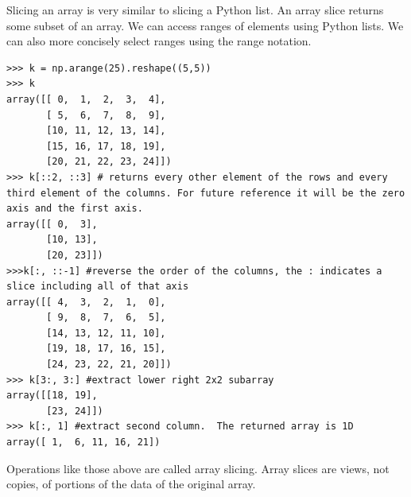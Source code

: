 Slicing an array is very similar to slicing a Python list. An array
slice returns some subset of an array. We can access ranges of elements
using Python lists. We can also more concisely select ranges using the
 range notation. 
\begin{lstlisting}
>>> k = np.arange(25).reshape((5,5)) 
>>> k
array([[ 0,  1,  2,  3,  4],
       [ 5,  6,  7,  8,  9],
       [10, 11, 12, 13, 14],
       [15, 16, 17, 18, 19],
       [20, 21, 22, 23, 24]])
>>> k[::2, ::3] # returns every other element of the rows and every third element of the columns. For future reference it will be the zero axis and the first axis.
array([[ 0,  3],
       [10, 13],
       [20, 23]])
>>>k[:, ::-1] #reverse the order of the columns, the : indicates a slice including all of that axis
array([[ 4,  3,  2,  1,  0],
       [ 9,  8,  7,  6,  5],
       [14, 13, 12, 11, 10],
       [19, 18, 17, 16, 15],
       [24, 23, 22, 21, 20]])
>>> k[3:, 3:] #extract lower right 2x2 subarray
array([[18, 19],
       [23, 24]])
>>> k[:, 1] #extract second column.  The returned array is 1D
array([ 1,  6, 11, 16, 21]) 
\end{lstlisting} 

Operations like those above
are called array slicing. Array slices are views, not copies, of
portions of the data of the original array.

% 
